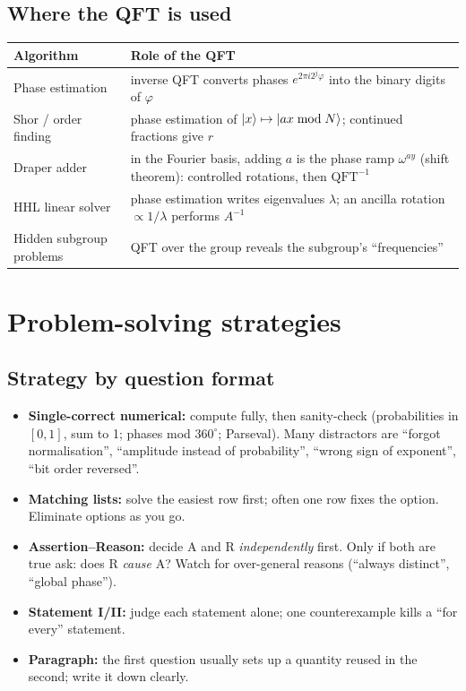\documentclass[11pt,a4paper,openany]{book}
\newcommand{\QFT}{\mathrm{QFT}}
\begin{document}
\subsection{Where the QFT is used}
\begin{tabularx}{\linewidth}{@{}lX@{}}
\toprule
\textbf{Algorithm} & \textbf{Role of the QFT}\\ \midrule
Phase estimation & inverse QFT converts phases $e^{2\pi i 2^j\varphi}$ into the binary digits of $\varphi$\\
Shor / order finding & phase estimation of $\ket{x}\mapsto\ket{ax \bmod N}$; continued fractions give $r$\\
Draper adder & in the Fourier basis, adding $a$ is the phase ramp $\omega^{ay}$ (shift theorem): controlled rotations, then $\QFT^{-1}$\\
HHL linear solver & phase estimation writes eigenvalues $\lambda$; an ancilla rotation $\propto 1/\lambda$ performs $A^{-1}$\\
Hidden subgroup problems & QFT over the group reveals the subgroup's ``frequencies''\\
\bottomrule
\end{tabularx}

\section{Problem-solving strategies}
\subsection{Strategy by question format}
\begin{itemize}[itemsep=3pt]
\item \textbf{Single-correct numerical:} compute fully, then sanity-check (probabilities in $[0,1]$, sum to 1; phases mod
      $360^\circ$; Parseval). Many distractors are ``forgot normalisation'', ``amplitude instead of probability'', ``wrong sign
      of exponent'', ``bit order reversed''.
\item \textbf{Matching lists:} solve the easiest row first; often one row fixes the option. Eliminate options as you go.
\item \textbf{Assertion--Reason:} decide A and R \emph{independently} first. Only if both are true ask: does R \emph{cause} A?
      Watch for over-general reasons (``always distinct'', ``global phase'').
\item \textbf{Statement I/II:} judge each statement alone; one counterexample kills a ``for every'' statement.
\item \textbf{Paragraph:} the first question usually sets up a quantity reused in the second; write it down clearly.
\end{itemize}
\end{document}
